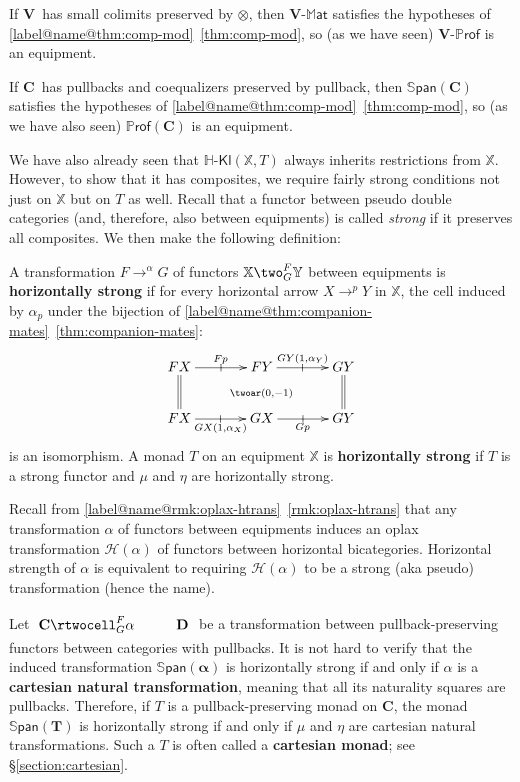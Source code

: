 \documentclass{tac}
\makeatletter
\newcommand{\V}{\ensuremath{\mathbf{V}}}
\newcommand{\C}{\ensuremath{\mathbf{C}}}
\newcommand{\calH}{\ensuremath{\mathcal{H}}}
\newcommand{\mb}[1]{{\mathbf{#1}}}
\newcommand{\MAT}[1]{\mathbf{#1}\mbox{-}\mathbb{M}\mathsf{at}}
\newcommand{\PROF}[1]{\mathbf{#1}\mbox{-}\mathbb{P}\mathsf{rof}}
\newcommand{\SPAN}[1]{\mathbb{S}\mathsf{pan}\!\left(\mb{#1}\right)}
\newcommand{\iPROF}[1]{\mathbb{P}\mathsf{rof}(\mb{#1})}
\newcommand{\Hkl}[2]{\mathbb{H}\text{-}\mathsf{Kl}(\mathbb{#1},#2)}
\numberwithin{equation}{section}
\def\currthmtype{}
\def\autoref#1{\ref*{label@name@#1}~\ref{#1}}
\def\autoref#1{\ref{label@name@#1}~\ref{#1}}
\let\old@label\label
\def\label#1{%
    {\let\your@currentlabel\@currentlabel%
      \edef\@currentlabel{\currthmtype}%
      \old@label{label@name@#1}}%
    \old@label{#1}}
\makeatother
\begin{document}
\begin{example}
  If \V\ has small colimits preserved by $\otimes$, then $\MAT{V}$
  satisfies the hypotheses of \autoref{thm:comp-mod}, so (as we have
  seen) $\PROF{V}$ is an equipment.
\end{example}

\begin{example}
  If \C\ has pullbacks and coequalizers preserved by pullback, then
  $\SPAN{C}$ satisfies the hypotheses of \autoref{thm:comp-mod}, so
  (as we have also seen) $\iPROF{C}$ is an equipment.
\end{example}

We have also already seen that $\Hkl{X}{T}$ always inherits
restrictions from $\mathbb{X}$.  However, to show that it has
composites, we require fairly strong conditions not just on
$\mathbb{X}$ but on $T$ as well.  Recall that a functor between pseudo
double categories (and, therefore, also between equipments) is called
\emph{strong} if it preserves all composites.  We then make the
following definition:

\begin{definition}
  A transformation $F\to^\alpha G$ of functors $\mathbb{X}
  \two^{F}_G \mathbb{Y}$ between equipments is \textbf{horizontally
    strong} if for every horizontal arrow $X\to^p Y$ in $\mathbb{X}$,
  the cell induced by $\alpha_p$ under the bijection of
  \autoref{thm:companion-mates}:
  \[\vcenter{\xymatrix@C=3pc{
      FX \ar[r]|-@{|}^{Fp}\ar@{=}[d] \ar@{}[drr]|{{\twoar(0,-1)}} &
      FY \ar[r]|-@{|}^{GY(1,{\alpha_Y})}&
      GY \ar@{=}[d]\\
      FX \ar[r]|-@{|}_{GX(1,{\alpha_X})} &
      GX \ar[r]|-@{|}_{Gp} &
      GY
    }}
  \]
  is an isomorphism.  A monad $T$ on an equipment $\mathbb{X}$ is
  \textbf{horizontally strong} if $T$ is a strong functor and $\mu$ and
  $\eta$ are horizontally strong.
\end{definition}

\begin{remark}\label{rmk:hstrong-htrans}
  Recall from \autoref{rmk:oplax-htrans} that any transformation
  $\alpha$ of functors between equipments induces an oplax
  transformation $\calH(\alpha)$ of functors between horizontal
  bicategories.  Horizontal strength of $\alpha$ is equivalent to
  requiring $\calH(\alpha)$ to be a strong (aka pseudo) transformation
  (hence the name).
\end{remark}

\begin{example}\label{eg:cart-mnd}
  Let $\xymatrix{\mb{C} \rtwocell^F_G{\alpha} & \mb{D}}$ be a
  transformation between pullback-preserving functors between
  categories with pullbacks.  It is not hard to verify that the
  induced transformation $\SPAN{\alpha}$ is horizontally strong if and
  only if $\alpha$ is a \textbf{cartesian natural transformation},
  meaning that all its naturality squares are pullbacks.  Therefore,
  if $T$ is a pullback-preserving monad on \C, the monad $\SPAN{T}$ is
  horizontally strong if and only if $\mu$ and $\eta$ are cartesian
  natural transformations.  Such a $T$ is often called a
  \textbf{cartesian monad}; see \S\ref{section:cartesian}.
\end{example}
\end{document}
